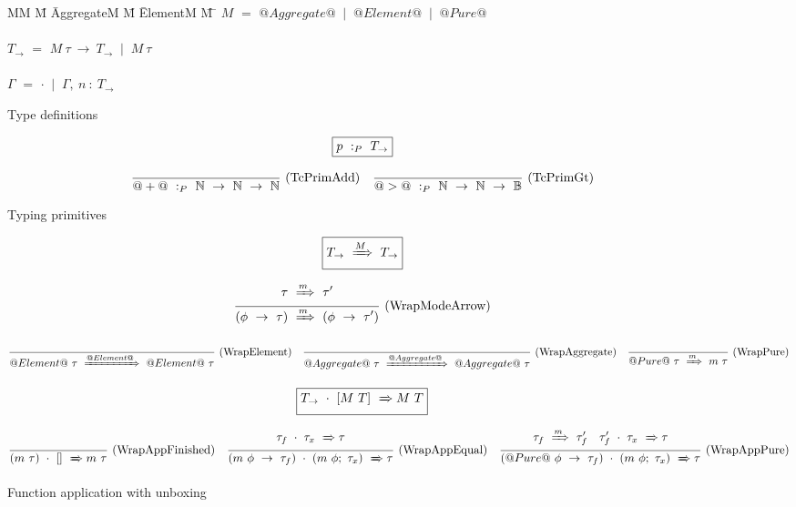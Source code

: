 
\begin{figure}

\begin{tabbing}
MM \= M \= AggregateM \= M \= ElementM \= M \= \kill
$M$
    \> $=$  \> $@Aggregate@$ \> $~|~$ \> $@Element@$ \> $~|~$ \> $@Pure@$         \\
\\
$T_{\to}$
    \> $=$  
            \> $M~\tau~\to~T_{\to}$
            \> $~|~$
            \> $M~\tau$ \\
\\
$\Gamma$
    \> $=$  
            \> $\cdot$
            \> $~|~$
            \> $\Gamma,~n~:~T_\to$ \\
\end{tabbing}

\caption{Type definitions}
\label{fig:source:type:defs}
\end{figure}


\begin{figure*}

$$
\boxed{p ~:_{P}~ T_\to}
$$


$$
\frac {\displaystyle 
} {\displaystyle  
    @+@ ~:_{P}~ \mathbb{N}~\to~\mathbb{N}~\to~\mathbb{N}
} \ 
\textrm{(TcPrimAdd)}
\quad
\frac {\displaystyle 
} {\displaystyle 
    @>@ ~:_{P}~ \mathbb{N}~\to~\mathbb{N}~\to~\mathbb{B}
} \ 
\textrm{(TcPrimGt)}
$$

\caption{Typing primitives}
\label{fig:source:type:prim}
\end{figure*}


\begin{figure*}

$$
\boxed{T_{\to} ~\xRightarrow{M}~ T_{\to}}
$$

$$
\frac {\displaystyle 
    \tau ~\xRightarrow{m}~ \tau'
} {\displaystyle 
    (\phi~\to~\tau) ~\xRightarrow{m}~ (\phi~\to~\tau')
} \ 
\textrm{(WrapModeArrow)}
$$

$$
\frac {\displaystyle  } {\displaystyle 
    @Element@~\tau ~\xRightarrow{@Element@}~ @Element@~\tau
} \ 
\textrm{(WrapElement)}
\quad
\frac {\displaystyle  } {\displaystyle 
    @Aggregate@~\tau ~\xRightarrow{@Aggregate@}~ @Aggregate@~\tau
} \ 
\textrm{(WrapAggregate)}
\quad
\frac {\displaystyle  } {\displaystyle 
    @Pure@~\tau ~\xRightarrow{m}~ m~\tau
} \ 
\textrm{(WrapPure)}
$$


$$
\boxed{T_{\to}~\cdot~[M~T] ~\xRightarrow~ M~T}
$$

$$
\frac {\displaystyle 
} {\displaystyle 
    (m~\tau)~\cdot~[] ~\xRightarrow~ m~\tau
} \ 
\textrm{(WrapAppFinished)}
\quad
\frac {\displaystyle 
    \tau_f~\cdot~\tau_x ~\xRightarrow~ \tau
} {\displaystyle 
    (m~\phi~\to~\tau_f)~\cdot~(m~\phi;~\tau_x) ~\xRightarrow~ \tau
} \ 
\textrm{(WrapAppEqual)}
\quad
\frac {\displaystyle 
    \tau_f ~\xRightarrow{m}~ \tau_f'
    \quad
    \tau_f'~\cdot~\tau_x ~\xRightarrow~ \tau
} {\displaystyle 
    (@Pure@~\phi~\to~\tau_f)~\cdot~(m~\phi;~\tau_x) ~\xRightarrow~ \tau
} \ 
\textrm{(WrapAppPure)}
$$

\caption{Function application with unboxing}
\label{fig:source:type:wrap}
\end{figure*}


